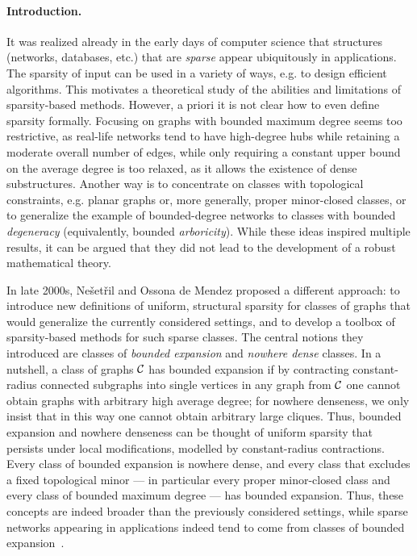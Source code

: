 \paragraph*{Introduction.}
It was realized already in the early days of computer science that structures (networks, databases, etc.) that are {\em{sparse}} appear ubiquitously in applications.
The sparsity of input can be used in a variety of ways, e.g. to design efficient algorithms. This motivates a theoretical study of the abilities and limitations of sparsity-based methods.
However, a priori it is not clear how to even define sparsity formally.
Focusing on graphs with bounded maximum degree seems too restrictive, as real-life networks tend to have high-degree hubs while retaining a moderate overall number of edges,
while only requiring a constant upper bound on the average degree is too relaxed, as it allows the existence of dense substructures.
Another way is to concentrate on classes with topological constraints, e.g. planar graphs or, more generally, proper minor-closed classes, 
or to generalize the example of bounded-degree networks to classes with bounded {\em{degeneracy}} (equivalently, bounded {\em{arboricity}}).
While these ideas inspired multiple results, it can be argued that they did not lead to the development of a robust mathematical theory.

In late 2000s, Ne\v{s}et\v{r}il and Ossona de Mendez proposed a different approach: 
to introduce new definitions of uniform, structural sparsity for classes of graphs that would generalize the currently considered settings,
and to develop a toolbox of sparsity-based methods for such sparse classes.
The central notions they introduced are classes of {\em{bounded expansion}} and {\em{nowhere dense}} classes.
In a nutshell, a class of graphs $\mathcal{C}$ has bounded expansion if by contracting constant-radius connected subgraphs into single vertices
in any graph from $\mathcal{C}$ one cannot obtain graphs with arbitrary high average degree; for nowhere denseness, we only insist that in this way one cannot obtain arbitrary large cliques.
Thus, bounded expansion and nowhere denseness can be thought of uniform sparsity that persists under local modifications, modelled by constant-radius contractions.
Every class of bounded expansion is nowhere dense, and every class that excludes a fixed topological minor --- in particular every proper minor-closed class and every class of bounded maximum degree ---
has bounded expansion. Thus, these concepts are indeed broader than the previously considered settings, while sparse networks appearing in applications indeed tend to come from
classes of bounded expansion~\cite{DemaineRRVSS14}.

